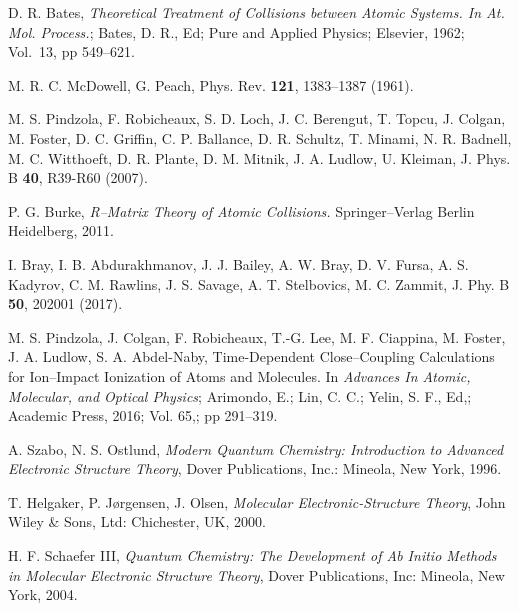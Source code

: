 \begin{thebibliography}{9}
D. R. Bates, 
\textit{Theoretical Treatment of Collisions between Atomic Systems.
In At. Mol. Process.};
Bates, D. R., Ed;
Pure and Applied Physics;
Elsevier, 1962;
Vol.~13, pp 549--621.

M. R. C. McDowell, G. Peach, 
Phys. Rev. \textbf{121}, 1383--1387 (1961).

M. S. Pindzola, F. Robicheaux, S. D. Loch, J. C. Berengut, T. Topcu, 
J. Colgan, M. Foster, D. C. Griffin, C. P. Ballance, D. R. Schultz,
T. Minami, N. R. Badnell, M. C. Witthoeft, D. R. Plante, D. M. Mitnik, 
J. A. Ludlow, U. Kleiman, 
J. Phys. B \textbf{40}, R39-R60 (2007).

P. G. Burke, 
\textit{R--Matrix Theory of Atomic Collisions.}
Springer--Verlag Berlin Heidelberg, 2011.

I. Bray, I. B. Abdurakhmanov, J. J. Bailey, A. W. Bray, D. V. Fursa,
A. S. Kadyrov, C. M. Rawlins, J. S. Savage, A. T. Stelbovics, M. C. Zammit,
J. Phy. B \textbf{50}, 202001 (2017).

M. S. Pindzola, J. Colgan, F. Robicheaux, T.-G. Lee, M. F. Ciappina,
M. Foster, J. A. Ludlow, S. A. Abdel-Naby,
Time-Dependent Close--Coupling Calculations for Ion--Impact Ionization of Atoms and Molecules. 
In \textit{Advances In Atomic, Molecular, and Optical Physics};
Arimondo, E.; Lin, C. C.; Yelin, S. F., Ed,; 
Academic Press, 2016; Vol. 65,; pp 291--319.

A. Szabo, N. S. Ostlund,
\textit{Modern Quantum Chemistry: Introduction to Advanced Electronic 
Structure Theory},
Dover Publications, Inc.: Mineola, New York, 1996.

T. Helgaker, P. J{\o}rgensen, J. Olsen,
\textit{Molecular Electronic-Structure Theory},
John Wiley {\&} Sons, Ltd: Chichester, UK, 2000.

H. F. Schaefer III,
\textit{Quantum Chemistry: The Development of Ab Initio Methods in
Molecular Electronic Structure Theory},
Dover Publications, Inc: Mineola, New York, 2004.

\begin{comment}

\bibitem{Cowan1981} 
R.D. Cowan, The Theory of Atomic Structure and Spectra}, 
University of California Press (1981). 

\bibitem{Brandsen1983} 
B.H. Brandsen and C.J. Joachin, 
Physics of atoms and molecules}, 
Longman Scientific and Technical (1984).
\end{comment}


\end{thebibliography}
